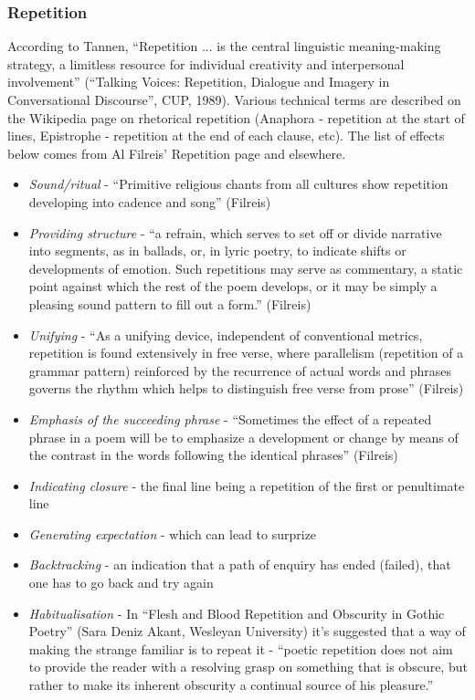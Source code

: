 \documentclass[11pt]{article}
\begin{document}
\subsubsection*{Repetition}
According to Tannen, ``Repetition ... is the central linguistic meaning-making strategy, a limitless resource for individual creativity and interpersonal involvement'' (``Talking Voices: Repetition, Dialogue and Imagery in Conversational Discourse'', CUP, 1989).
Various technical terms are described on the Wikipedia page on rhetorical repetition (Anaphora - repetition at the start of lines, Epistrophe - repetition at the end of each clause, etc). The list of effects below comes from Al Filreis' Repetition page and elsewhere.
\begin{itemize}
\item \textit{Sound/ritual} - ``Primitive religious chants from all cultures show repetition developing into cadence and song'' (Filreis)
\item \textit{Providing structure} -  ``a refrain, which serves to set off or divide narrative into segments, as in ballads, or, in lyric poetry, to indicate shifts or developments of emotion. Such repetitions may serve as commentary, a static point against which the rest of the poem develops, or it may be simply a pleasing sound pattern to fill out a form.''  (Filreis)
\item \textit{Unifying} - ``As a unifying device, independent of conventional metrics, repetition is found extensively in free verse, where parallelism (repetition of a grammar pattern) reinforced by the recurrence of actual words and phrases governs the rhythm which helps to distinguish free verse from prose''  (Filreis)
\item \textit{Emphasis of the succeeding phrase} - ``Sometimes the effect of a repeated phrase in a poem will be to emphasize a development or change by means of the contrast in the words following the identical phrases''  (Filreis)
\item \textit{Indicating closure} - the final line being a repetition of the first or penultimate line
\item \textit{Generating expectation} - which can lead to surprize
\item \textit{Backtracking} - an indication that a path of enquiry has ended (failed), that one has to go back and try again
\item \textit{Habitualisation} - In ``Flesh and Blood Repetition and Obscurity in Gothic Poetry'' (Sara Deniz Akant,
Wesleyan University) it's suggested that a way of making the strange familiar is to repeat it - ``poetic repetition does not aim to provide the reader with a resolving grasp on something that is obscure, but rather to make its inherent obscurity a continual source of his pleasure.''


\end{itemize}
\end{document}
